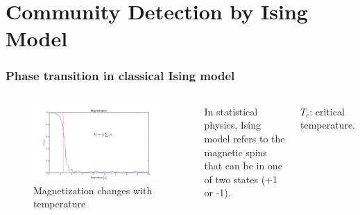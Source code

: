 \documentclass[notheorems]{beamer}
\begin{document}
\section[Ising Model]{Community Detection by Ising Model}
\begin{frame}
	\tableofcontents[currentsection]
\end{frame}
\begin{frame}
\frametitle{Phase transition in classical Ising model}
	\begin{columns}
		\begin{figure}
			\includegraphics[width=\textwidth]{monte-carlo-ising-6.png}
			\caption*{Magnetization changes with temperature}
		\end{figure}
	In statistical physics, Ising model refers to the magnetic spins that can be in one of two states (+1 or -1).
	
	$T_c$: critical temperature.
	

\end{columns}
\end{frame}
\end{document}
